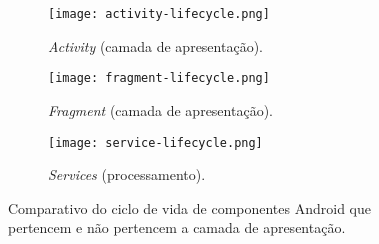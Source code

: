 \begin{figure*}[!htb]
\centering
  \begin{subfigure}[b]{.33\textwidth}
    \centering
    \texttt{[image: activity-lifecycle.png]}
    \caption{\textit{Activity} (camada de apresentação).}
    \label{fig:activity-lifecycle}
  \end{subfigure}
  \begin{subfigure}[b]{.33\textwidth}
    \centering
    \texttt{[image: fragment-lifecycle.png]}
    \caption{\textit{Fragment} (camada de apresentação).}
    \label{fig:activity-lifecycle}
  \end{subfigure}
  \begin{subfigure}[b]{.30\textwidth}
    \centering
    \texttt{[image: service-lifecycle.png]}
    \caption{\textit{Services} (processamento).}
    \label{fig:service-lifecycle}
  \end{subfigure}%
\caption{Comparativo do ciclo de vida de componentes Android que pertencem e não pertencem a camada de apresentação.}
\label{fig:android-lifecycles}
\vspace{-.5cm} 
\end{figure*}

